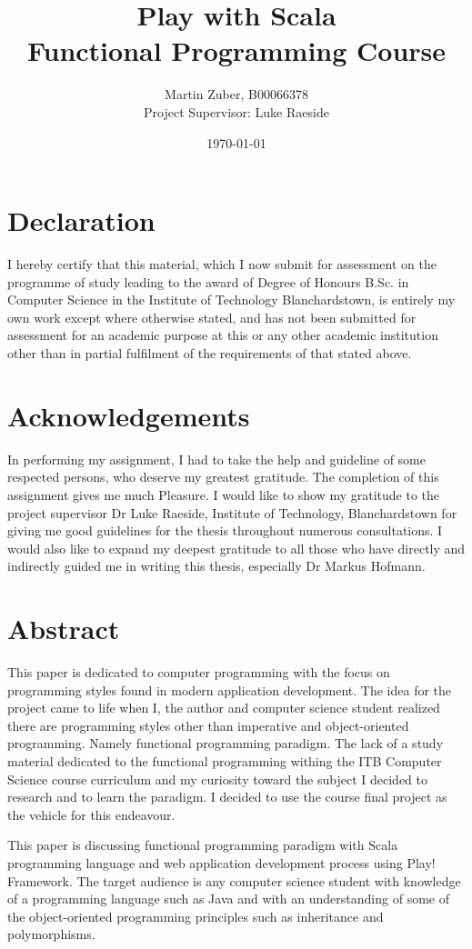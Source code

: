 \documentclass[12pt,twoside,a4paper]{report}
\title{Play with Scala\\Functional Programming Course}
\author{Martin Zuber, B00066378 \\ Project Supervisor:  Luke Raeside}
\date{\today}
\begin{document}
\maketitle
\newpage

\chapter*{Declaration}
I hereby certify that this material, which I now submit for assessment on the programme of study leading to the award of Degree of Honours B.Sc. in Computer Science in the Institute of Technology Blanchardstown, is entirely my own work except where otherwise stated, and has not been submitted for assessment for an academic purpose at this or any other academic institution other than in partial fulfilment of the requirements of that stated above.

\chapter*{Acknowledgements}
In performing my assignment, I had to take the help and guideline of some respected persons, who deserve my greatest gratitude. The completion of this assignment gives me much Pleasure. I would like to show my gratitude to the project supervisor Dr Luke Raeside, Institute of Technology, Blanchardstown for giving me good guidelines for the thesis throughout numerous consultations. I would also like to expand my deepest gratitude to all those who have directly and indirectly guided me in writing this thesis, especially Dr Markus Hofmann.

\chapter*{Abstract}
This paper is dedicated to computer programming with the focus on programming styles found in modern application development. The idea for the project came to life when I, the author and computer science student realized there are programming styles other than imperative and object-oriented programming. Namely functional programming paradigm. The lack of a study material dedicated to the functional programming withing the ITB Computer Science course curriculum and my curiosity toward the subject I decided to research and to learn the paradigm. I decided to use the course final project as the vehicle for this endeavour.\par
This paper is discussing functional programming paradigm with Scala programming language and web application development process using Play! Framework. The target audience is any computer science student with knowledge of a programming language such as Java and with an understanding of some of the object-oriented programming principles such as inheritance and polymorphisms.
\end{document}
